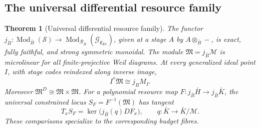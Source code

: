 \documentclass[11pt,a4paper]{article}
\numberwithin{algorithm}{section}
\numberwithin{equation}{section}
\newtheorem{theorem}{Theorem}[section]
\theoremstyle{definition}
\theoremstyle{remark}
\theoremstyle{plain}
\newcommand{\Mod}{\operatorname{Mod}}
\newcommand{\Ev}{{\operatorname{Ev}}}
\newcommand{\Cplx}{\mathfrak C_{\Ev}}
\theoremstyle{definition}
\theoremstyle{plain}
\begin{document}
\subsection{The universal differential resource family}
\begin{theorem}[Universal differential resource family]
\label{thm:universal-weil}
The functor
$j_{\bar B}:\Mod_{\bar B}(\mathscr S)
\to\Mod_{\mathcal R_{\bar B}}(\mathcal G_{\Cplx})$,
given at a stage $A$ by $A\otimes_{\bar B}-$, is exact,
fully faithful, and strong symmetric monoidal. The module
$\mathfrak M=j_{\bar B}\mathscr M$ is microlinear for all
finite-projective Weil diagrams. At every generalized ideal
point $I$, with stage codes reindexed along inverse image,
\begin{equation}\label{eq:weils-fibres}
 I^*\mathfrak M\cong j_BM_I.
\end{equation}
Moreover $\mathfrak M^D\cong\mathfrak M\times\mathfrak M$.
For a polynomial resource map
$F:j_{\bar B}\bar H\to j_{\bar B}\bar K$, the universal
constrained locus $S_F=F^{-1}(\mathfrak M)$ has tangent
\begin{equation}\label{eq:universal-normal}
 T_xS_F=\ker\bigl(j_{\bar B}(q)DF_x\bigr),
 \qquad q:\bar K\to\bar K/\mathscr M.
\end{equation}
These comparisons specialize to the corresponding budget fibres.
\end{theorem}
\end{document}
